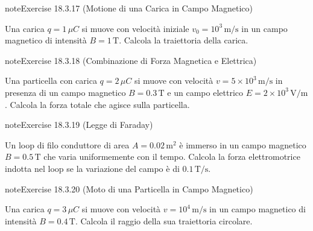 \documentclass[letterpaper,10pt,italian]{jupyterBook}
\begin{document}
\begin{sphinxadmonition}{note}{Exercise 18.3.17 (Motione di una Carica in Campo Magnetico)}



\sphinxAtStartPar
Una carica \(q = 1 \, \mu C\) si muove con velocità iniziale \(v_0 = 10^3 \, \text{m/s}\) in un campo magnetico di intensità \(B = 1 \, \text{T}\). Calcola la traiettoria della carica.
\end{sphinxadmonition}
 \label{exercise:ch/electromagnetism/electromagnetism-steady-problems-exercise-17}

\begin{sphinxadmonition}{note}{Exercise 18.3.18 (Combinazione di Forza Magnetica e Elettrica)}



\sphinxAtStartPar
Una particella con carica \(q = 2 \, \mu C\) si muove con velocità \(v = 5 \times 10^3 \, \text{m/s}\) in presenza di un campo magnetico \(B = 0.3 \, \text{T}\) e un campo elettrico \(E = 2 \times 10^3 \, \text{V/m}\). Calcola la forza totale che agisce sulla particella.
\end{sphinxadmonition}
 \label{exercise:ch/electromagnetism/electromagnetism-steady-problems-exercise-18}

\begin{sphinxadmonition}{note}{Exercise 18.3.19 (Legge di Faraday)}



\sphinxAtStartPar
Un loop di filo conduttore di area \(A = 0.02 \, \text{m}^2\) è immerso in un campo magnetico \(B = 0.5 \, \text{T}\) che varia uniformemente con il tempo. Calcola la forza elettromotrice indotta nel loop se la variazione del campo è di \(0.1 \, \text{T/s}\).
\end{sphinxadmonition}
 \label{exercise:ch/electromagnetism/electromagnetism-steady-problems-exercise-19}

\begin{sphinxadmonition}{note}{Exercise 18.3.20 (Moto di una Particella in Campo Magnetico)}



\sphinxAtStartPar
Una carica \(q = 3 \, \mu C\) si muove con velocità \(v = 10^4 \, \text{m/s}\) in un campo magnetico di intensità \(B = 0.4 \, \text{T}\). Calcola il raggio della sua traiettoria circolare.
\end{sphinxadmonition}
 \label{exercise:ch/electromagnetism/electromagnetism-steady-problems-exercise-20}
\end{document}
